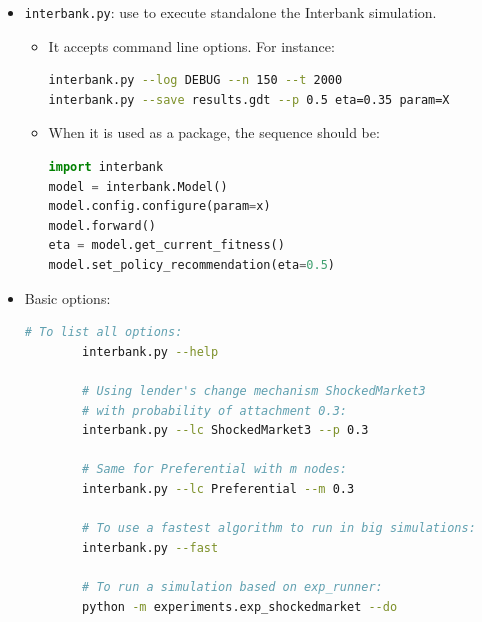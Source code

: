 \documentclass{article}
\begin{document}
\begin{itemize}
    \item \texttt{interbank.py}: use to execute standalone the Interbank simulation.
    \begin{itemize}
        \item It accepts command line options. For instance:
            \begin{lstlisting}[language=bash, basicstyle=\ttfamily\small]
interbank.py --log DEBUG --n 150 --t 2000
interbank.py --save results.gdt --p 0.5 eta=0.35 param=X
            \end{lstlisting}
        \item When it is used as a package, the sequence should be:
            \begin{lstlisting}[language=Python, basicstyle=\ttfamily\small]
import interbank
model = interbank.Model()
model.config.configure(param=x)
model.forward()
eta = model.get_current_fitness()
model.set_policy_recommendation(eta=0.5)
            \end{lstlisting}
    \end{itemize}
    \item Basic options:
        \begin{lstlisting}[language=bash, basicstyle=\ttfamily\small]
        # To list all options:
        interbank.py --help

        # Using lender's change mechanism ShockedMarket3
        # with probability of attachment 0.3:
        interbank.py --lc ShockedMarket3 --p 0.3

        # Same for Preferential with m nodes:
        interbank.py --lc Preferential --m 0.3

        # To use a fastest algorithm to run in big simulations:
        interbank.py --fast

        # To run a simulation based on exp_runner:
        python -m experiments.exp_shockedmarket --do
        \end{lstlisting}


\end{itemize}
\end{document}
